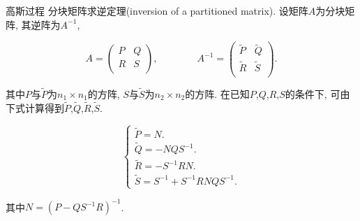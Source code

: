 \documentclass[10pt,mathserif]{beamer}
\theoremstyle{definition}
\numberwithin{equation}{section} %
\begin{document}
    \begin{frame}[fragile]{高斯过程}
        分块矩阵求逆定理(inversion of a partitioned matrix). 设矩阵$A$为分块矩阵, 其逆阵为$A^{-1}$,

        \begin{equation}
            A=  \begin{pmatrix}
                    P & Q \\
                    R & S \\
                \end{pmatrix}, \qquad\qquad
            A^{-1}= \begin{pmatrix}
                        \tilde{P} & \tilde{Q} \\
                        \tilde{R} & \tilde{S} \\
                    \end{pmatrix}.
        \end{equation}

        其中$P$与$\tilde{P}$为$n_{1}\times n_{1}$的方阵, $S$与$\tilde{S}$为$n_{2}\times n_{2}$的方阵. 在已知$P$,$Q$,$R$,$S$的条件下, 可由下式计算得到$\tilde{P}$,$\tilde{Q}$,$\tilde{R}$,$\tilde{S}$.

        \begin{equation}
            \begin{cases}
                \tilde{P}=N. \\
                \tilde{Q}=-NQS^{-1}. \\ 
                \tilde{R}=-S^{-1}RN. \\
                \tilde{S}=S^{-1}+S^{-1}RNQS^{-1}.
            \end{cases}
        \end{equation}

        其中$N=(P-QS^{-1}R)^{-1}$.
    \end{frame}
\end{document}
